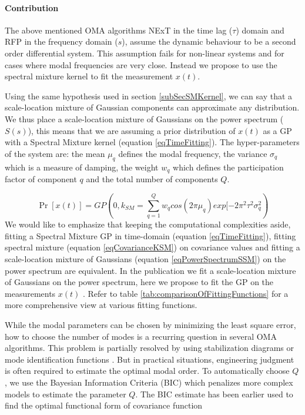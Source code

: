 \begin{mdframed}[hidealllines=true,backgroundcolor=blue!20]
\paragraph{Contribution}
The above mentioned OMA algorithms NExT in the time lag ($ \tau$) domain and RFP in the frequency domain ($s$), assume the dynamic behaviour to be a second order differential system. This assumption fails for non-linear systems and for cases where modal frequencies are very close. Instead we propose to use the spectral mixture kernel to fit the measurement $x(t)$. 

Using the same hypothesis used in section \ref{subSecSMKernel}, we can say that a scale-location mixture of Gaussian components can approximate any distribution. We thus place a scale-location mixture of Gaussians on the power spectrum ($S(s)$), this means that we are assuming a prior distribution of $x(t)$ as a GP with a Spectral Mixture kernel (equation \ref{eqTimeFitting}). The hyper-parameters of the system are: the mean $\mu_{q}$ defines the modal frequency, the variance $\sigma_{q}$ which is a measure of damping, the weight $w_{q}$ which defines the participation factor of component $q$ and the total number of components $Q$.

\begin{equation}\label{eqTimeFitting}
\Pr[x(t)] = GP(0, k_{SM} = \sum_{q=1}^{Q}w_{q}cos(2\pi\mu_{q}) exp[-2\pi^{2}\tau^{2}\sigma_{q}^2)
\end{equation}
\sloppy We would like to emphasize that keeping the computational complexities aside, fitting a Spectral Mixture GP in time-domain (equation \ref{eqTimeFitting}), fitting spectral mixture (equation \ref{eqCovarianceKSM}) on covariance values and fitting a scale-location mixture of Gaussians (equation \ref{eqPowerSpectrumSSM}) on the power spectrum are equivalent. In the publication \cite{chiplunkar2017operational} we fit a scale-location mixture of Gaussians on the power spectrum, here we propose to fit the GP on the measurements $x(t)$ . Refer to table \ref{tab:comparisonOfFittingFunctions} for a more comprehensive view at various fitting functions.


While the modal parameters can be chosen by minimizing the least square error, how to choose the number of modes is a recurring question in several OMA algorithms. This problem is partially resolved by using stabilization diagrams or mode identification functions \cite{allemang1998unified, williams1985multivariate, shih1988complex}. But in practical situations, engineering judgment is often required to estimate the optimal modal order. To automatically choose $Q$, we use the Bayesian Information Criteria (BIC) \cite{findley1991counterexamples} which penalizes more complex models to estimate the parameter $Q$. The BIC estimate has been earlier used to find the optimal functional form of covariance function \cite{duvenaud2013structure}


\end{mdframed}
